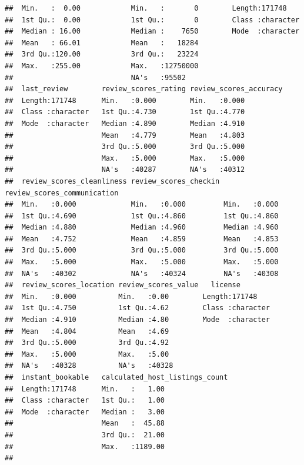 \documentclass[
]{article}
\begin{document}
\begin{verbatim}
##  Min.   :  0.00            Min.   :       0        Length:171748     
##  1st Qu.:  0.00            1st Qu.:       0        Class :character  
##  Median : 16.00            Median :    7650        Mode  :character  
##  Mean   : 66.01            Mean   :   18284                          
##  3rd Qu.:120.00            3rd Qu.:   23224                          
##  Max.   :255.00            Max.   :12750000                          
##                            NA's   :95502                             
##  last_review        review_scores_rating review_scores_accuracy
##  Length:171748      Min.   :0.000        Min.   :0.000         
##  Class :character   1st Qu.:4.730        1st Qu.:4.770         
##  Mode  :character   Median :4.890        Median :4.910         
##                     Mean   :4.779        Mean   :4.803         
##                     3rd Qu.:5.000        3rd Qu.:5.000         
##                     Max.   :5.000        Max.   :5.000         
##                     NA's   :40287        NA's   :40312         
##  review_scores_cleanliness review_scores_checkin review_scores_communication
##  Min.   :0.000             Min.   :0.000         Min.   :0.000              
##  1st Qu.:4.690             1st Qu.:4.860         1st Qu.:4.860              
##  Median :4.880             Median :4.960         Median :4.960              
##  Mean   :4.752             Mean   :4.859         Mean   :4.853              
##  3rd Qu.:5.000             3rd Qu.:5.000         3rd Qu.:5.000              
##  Max.   :5.000             Max.   :5.000         Max.   :5.000              
##  NA's   :40302             NA's   :40324         NA's   :40308              
##  review_scores_location review_scores_value   license         
##  Min.   :0.000          Min.   :0.00        Length:171748     
##  1st Qu.:4.750          1st Qu.:4.62        Class :character  
##  Median :4.910          Median :4.80        Mode  :character  
##  Mean   :4.804          Mean   :4.69                          
##  3rd Qu.:5.000          3rd Qu.:4.92                          
##  Max.   :5.000          Max.   :5.00                          
##  NA's   :40328          NA's   :40328                         
##  instant_bookable   calculated_host_listings_count
##  Length:171748      Min.   :   1.00               
##  Class :character   1st Qu.:   1.00               
##  Mode  :character   Median :   3.00               
##                     Mean   :  45.88               
##                     3rd Qu.:  21.00               
##                     Max.   :1189.00               
##                                                   

\end{verbatim}
\end{document}
